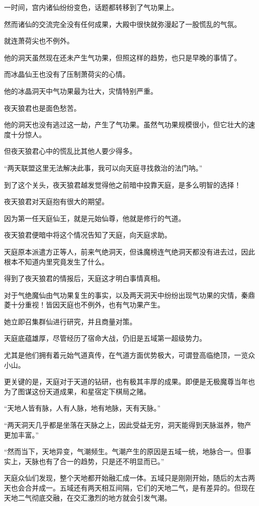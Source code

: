 \begin{this_body}
一时间，宫内诸仙纷纷变色，话题都转移到了气功果上。

然而诸仙的交流完全没有任何成果，大殿中很快就弥漫起了一股慌乱的气氛。

就连萧荷尖也不例外。

他的洞天虽然现在还未产生气功果，但照这样的趋势，也只是早晚的事情了。

而冰晶仙王也没有了压制萧荷尖的心情。

他的冰晶洞天中气功果最为壮大，灾情特别严重。

夜天狼君也是面色愁苦。

他的洞天也没有逃过这一劫，产生了气功果。虽然气功果规模很小，但它壮大的速度十分惊人。

但夜天狼君心中的慌乱比其他人要少得多。

“两天联盟这里无法解决此事，我可以向天庭寻找救治的法门呐。”

到了这个关头，夜天狼君越发觉得他之前暗中投靠天庭，是多么明智的选择！

夜天狼君对天庭抱有很大的期望。

因为第一任天庭仙王，就是元始仙尊，他就是修行的气道。

夜天狼君便暗中将这个情况告知了天庭，向天庭求助。

天庭原本派遣方正等人，前来气绝洞天，但诛魔榜连气绝洞天都没有进去过，因此根本不知道内里究竟发生了什么。

得到了夜天狼君的情报后，天庭这才明白事情真相。

对于气绝魔仙由气功果复生的事实，以及两天洞天中纷纷出现气功果的灾情，秦鼎菱十分重视！皆因天庭也不例外，也有气功果产生。

她立即召集群仙进行研究，并且商量对策。

天庭底蕴雄厚，尽管经历了宿命大战，仍旧是五域第一超级势力。

尤其是他们拥有着元始气道真传，在气道方面优势极大，可谓登高临绝顶，一览众小山。

更关键的是，天庭对于天道的钻研，也有极其丰厚的成果。即便是无极魔尊当年也为了图谋这份天道成果，和星宿定下棋局之赌。

“天地人皆有脉，人有人脉，地有地脉，天有天脉。”

“两天洞天几乎都是坐落在天脉之上，因此受益无穷，洞天能得到天脉滋养，物产更加丰富。”

“然而当下，天地异变，气潮频生。气潮产生的原因是五域一统，地脉合一。但事实上，天脉也有了合一的趋势，只是还不明显而已。”

天庭众仙们发现，整个天地都开始融汇成一体。五域只是刚刚开始，随后的太古两天也会合并成一。五域还有两天相互间隔，它们的天地二气，是有差异的。但现在天地二气彻底交融，在交汇激烈的地方就会引发气潮。


\end{this_body}
